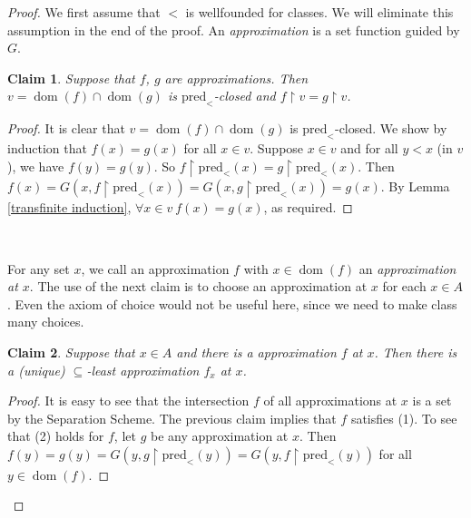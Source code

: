 \documentclass[a4paper, 11pt]{amsart}
\newtheorem*{claim*}{Claim}
\theoremstyle{remark}
\newcommand{\pred}{\mathrm{pred}}
\DeclareMathOperator{\dom}{dom}
\begin{document}
\begin{proof} 
We first assume that $<$ is wellfounded for classes. We will eliminate this assumption in the end of the proof. 
An \emph{approximation} is a set function guided by $G$. 

\begin{claim*} 
Suppose that 
$f$, $g$ are approximations. 
Then $v=\dom(f)\cap \dom(g)$ is $\pred_<$-closed and $f{\upharpoonright}v=g{\upharpoonright}v$. 
\end{claim*} 
\begin{proof} 
It is clear that $v=\dom(f)\cap \dom(g)$ is $\pred_<$-closed. 
We show by induction that $f(x)=g(x)$ for all $x\in v$. 
Suppose $x\in v$ and for all $y<x$ (in $v$), we have $f(y)=g(y)$. 
So $f{\upharpoonright}\pred_<(x)=g{\upharpoonright}\pred_<(x)$. 
Then $f(x)=G(x,f{\upharpoonright}\pred_<(x))=G(x,g{\upharpoonright}\pred_<(x))=g(x)$. 
By Lemma \ref{transfinite induction}, $\forall x\in v\ f(x)=g(x)$, as required. 
\end{proof} 

\ \\ 


For any set $x$, we call an approximation $f$ with $x \in \dom(f)$ an \emph{approximation at $x$}. 
The use of the next claim is to choose an approximation at $x$ for each $x\in A$. 
Even the axiom of choice would not be useful here, since we need to make class many choices. 

\begin{claim*} 
Suppose that $x\in A$ and there is a approximation $f$ at $x$. 
Then there is a (unique) $\subseteq$-least approximation $f_x$ at $x$. 
\end{claim*} 
\begin{proof} 
It is easy to see that the intersection $f$ of all approximations at $x$ is a set by the Separation Scheme. 
The previous claim implies that $f$ satisfies (1). 
To see that (2) holds for $f$, let $g$ be any approximation at $x$. 
Then $f(y)=g(y)=G(y,g{\upharpoonright}\pred_<(y))=G(y,f{\upharpoonright}\pred_<(y))$ for all $y\in \dom(f)$. 
\end{proof} 


\end{proof}
\end{document}
